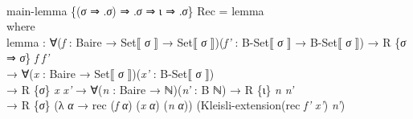\documentclass{entcs} \usepackage{prentcsmacro}
\newcommand{\AgdaFontStyle}[1]{\textsf{#1}}
\newcommand{\AgdaBoundFontStyle}[1]{\textit{#1}}
\newcommand{\AgdaKeyword}     [1]
    {\AgdaFontStyle{\textcolor{AgdaKeyword}{#1}}}
\newcommand{\AgdaSymbol}      [1]{\textcolor{AgdaSymbol}{#1}}
\newcommand{\AgdaBound}    [1]{\AgdaBoundFontStyle{\textcolor{AgdaBound}{#1}}}
\newcommand{\AgdaInductiveConstructor}[1]
    {\AgdaFontStyle{\textcolor{AgdaInductiveConstructor}{#1}}}
\newcommand{\AgdaDatatype} [1]{\AgdaFontStyle{\textcolor{AgdaDatatype}{#1}}}
\newcommand{\AgdaFunction} [1]{\AgdaFontStyle{\textcolor{AgdaFunction}{#1}}}
\newcommand{\AgdaIndent}[1]{\quad}
\newcommand{\AgdaCodeStyle}{\small}
\newenvironment{code}%
{\noindent\AgdaCodeStyle\pboxed}%
{\endpboxed\par\noindent%
\ignorespacesafterend}
\begin{document}
\begin{code}\>\<%
\\
\>\AgdaFunction{main-lemma} \AgdaSymbol{\{(}\AgdaBound{σ} \AgdaInductiveConstructor{⇒} \AgdaSymbol{.}\AgdaBound{σ}\AgdaSymbol{)} \AgdaInductiveConstructor{⇒} \AgdaSymbol{.}\AgdaBound{σ} \AgdaInductiveConstructor{⇒} \AgdaInductiveConstructor{ι} \AgdaInductiveConstructor{⇒} \AgdaSymbol{.}\AgdaBound{σ}\AgdaSymbol{\}} \AgdaInductiveConstructor{Rec} \AgdaSymbol{=} \AgdaFunction{lemma}\<%
\\
\>[0]\AgdaIndent{2}{}\<[2]%
\>[2]\AgdaKeyword{where}\<%
\\
\>[2]\AgdaIndent{4}{}\<[4]%
\>[4]\AgdaFunction{lemma} \AgdaSymbol{:} \AgdaSymbol{∀(}\AgdaBound{f} \AgdaSymbol{:} \AgdaFunction{Baire} \AgdaSymbol{→} \AgdaFunction{Set⟦} \AgdaBound{σ} \AgdaFunction{⟧} \AgdaSymbol{→} \AgdaFunction{Set⟦} \AgdaBound{σ} \AgdaFunction{⟧}\AgdaSymbol{)(}\AgdaBound{f'} \AgdaSymbol{:} \AgdaFunction{B-Set⟦} \AgdaBound{σ} \AgdaFunction{⟧} \AgdaSymbol{→} \AgdaFunction{B-Set⟦} \AgdaBound{σ} \AgdaFunction{⟧}\AgdaSymbol{)} \AgdaSymbol{→} \AgdaFunction{R} \AgdaSymbol{\{}\AgdaBound{σ} \AgdaInductiveConstructor{⇒} \AgdaBound{σ}\AgdaSymbol{\}} \AgdaBound{f} \AgdaBound{f'} \<[94]%
\>[94]\<%
\\
\>[4]\AgdaIndent{6}{}\<[6]%
\>[6]\AgdaSymbol{→} \AgdaSymbol{∀(}\AgdaBound{x} \AgdaSymbol{:} \AgdaFunction{Baire} \AgdaSymbol{→} \AgdaFunction{Set⟦} \AgdaBound{σ} \AgdaFunction{⟧}\AgdaSymbol{)(}\AgdaBound{x'} \AgdaSymbol{:} \AgdaFunction{B-Set⟦} \AgdaBound{σ} \AgdaFunction{⟧}\AgdaSymbol{)} \<[49]%
\>[49]\<%
\\
\>[4]\AgdaIndent{6}{}\<[6]%
\>[6]\AgdaSymbol{→} \AgdaFunction{R} \AgdaSymbol{\{}\AgdaBound{σ}\AgdaSymbol{\}} \AgdaBound{x} \AgdaBound{x'} \AgdaSymbol{→} \AgdaSymbol{∀(}\AgdaBound{n} \AgdaSymbol{:} \AgdaFunction{Baire} \AgdaSymbol{→} \AgdaDatatype{ℕ}\AgdaSymbol{)(}\AgdaBound{n'} \AgdaSymbol{:} \AgdaFunction{B} \AgdaDatatype{ℕ}\AgdaSymbol{)} \AgdaSymbol{→} \AgdaFunction{R} \AgdaSymbol{\{}\AgdaInductiveConstructor{ι}\AgdaSymbol{\}} \AgdaBound{n} \AgdaBound{n'}\<%
\\
\>[4]\AgdaIndent{6}{}\<[6]%
\>[6]\AgdaSymbol{→} \AgdaFunction{R} \AgdaSymbol{\{}\AgdaBound{σ}\AgdaSymbol{\}} \AgdaSymbol{(λ} \AgdaBound{α} \AgdaSymbol{→} \AgdaFunction{rec} \AgdaSymbol{(}\AgdaBound{f} \AgdaBound{α}\AgdaSymbol{)} \AgdaSymbol{(}\AgdaBound{x} \AgdaBound{α}\AgdaSymbol{)} \AgdaSymbol{(}\AgdaBound{n} \AgdaBound{α}\AgdaSymbol{))} \AgdaSymbol{(}\AgdaFunction{Kleisli-extension}\AgdaSymbol{(}\AgdaFunction{rec} \AgdaBound{f'} \AgdaBound{x'}\AgdaSymbol{)} \AgdaBound{n'}\AgdaSymbol{)}\<%

\end{code}
\end{document}
